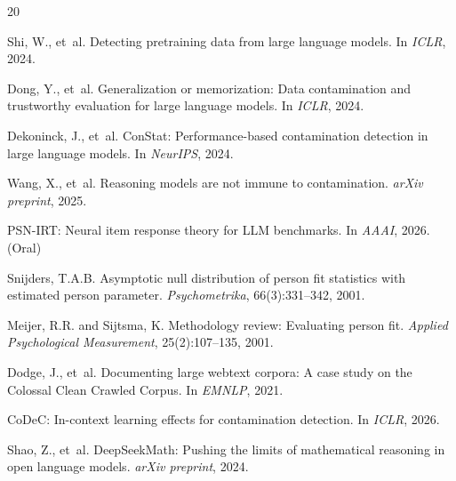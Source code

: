 \documentclass[11pt,a4paper]{article}
\begin{document}

\begin{thebibliography}{20}

Shi, W., et~al.
\newblock Detecting pretraining data from large language models.
\newblock In \emph{ICLR}, 2024.

Dong, Y., et~al.
\newblock Generalization or memorization: Data contamination and trustworthy evaluation for large language models.
\newblock In \emph{ICLR}, 2024.

Dekoninck, J., et~al.
\newblock ConStat: Performance-based contamination detection in large language models.
\newblock In \emph{NeurIPS}, 2024.

Wang, X., et~al.
\newblock Reasoning models are not immune to contamination.
\newblock \emph{arXiv preprint}, 2025.

PSN-IRT: Neural item response theory for LLM benchmarks.
\newblock In \emph{AAAI}, 2026. (Oral)

Snijders, T.A.B.
\newblock Asymptotic null distribution of person fit statistics with estimated person parameter.
\newblock \emph{Psychometrika}, 66(3):331--342, 2001.

Meijer, R.R. and Sijtsma, K.
\newblock Methodology review: Evaluating person fit.
\newblock \emph{Applied Psychological Measurement}, 25(2):107--135, 2001.

Dodge, J., et~al.
\newblock Documenting large webtext corpora: A case study on the Colossal Clean Crawled Corpus.
\newblock In \emph{EMNLP}, 2021.

CoDeC: In-context learning effects for contamination detection.
\newblock In \emph{ICLR}, 2026.

Shao, Z., et~al.
\newblock DeepSeekMath: Pushing the limits of mathematical reasoning in open language models.
\newblock \emph{arXiv preprint}, 2024.

\end{thebibliography}
\end{document}
